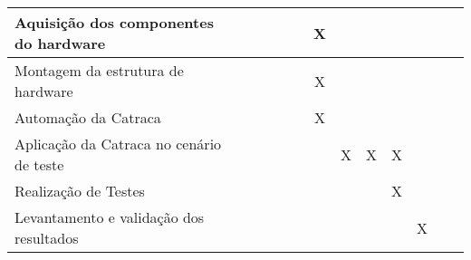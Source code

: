 \begin{table}[ht]
\begin{adjustbox}{width=\textwidth}
\begin{tabular}{|l|l|l|l|l|l|l|l|l|l|l|l|l|}
            Aquisição dos componentes do hardware                                                &                        &                        &                        &                        &                        & \multicolumn{1}{c|}{X} &                        &                        &                        &                        &                        &                        \\ \hline
            Montagem da estrutura de hardware                                                    &                        &                        &                        &                        &                        & \multicolumn{1}{c|}{X} & \multicolumn{1}{c|}{}  & \multicolumn{1}{c|}{}  & \multicolumn{1}{c|}{}  &                        &                        &                        \\ \hline
            Automação da Catraca                                                                 &                        &                        &                        &                        &                        & \multicolumn{1}{c|}{X} &                        &                        &                        &                        &                        &                        \\ \hline
            Aplicação da Catraca no cenário de teste                                             &                        &                        &                        &                        &                        & \multicolumn{1}{c|}{}  & \multicolumn{1}{c|}{X} & \multicolumn{1}{c|}{X} & \multicolumn{1}{c|}{X} &                        &                        &                        \\ \hline
            Realização de Testes                                                                 &                        &                        &                        &                        &                        &                        &                        &                        & \multicolumn{1}{c|}{X} & \multicolumn{1}{c|}{}  &                        &                        \\ \hline
            Levantamento e validação dos resultados                                              &                        &                        &                        &                        &                        &                        &                        &                        &                        & \multicolumn{1}{c|}{X} &                        &                        \\ \hline

\end{tabular}
\end{adjustbox}
\end{table}
